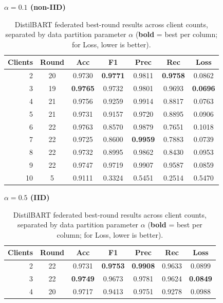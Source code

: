 \documentclass[conference]{IEEEtran}
\begin{document}
\begin{table}[t]
    \centering
    \caption{DistilBART federated best-round results across client counts, separated by data partition parameter $\alpha$ (\textbf{bold} = best per column; for Loss, lower is better).}
    \label{tab:fed_best_distilbart}
    {\small
    \begin{minipage}[t]{0.48\textwidth}
        \centering
        \textbf{$\alpha{=}0.1$ (non-IID)}\\[2pt]
        \begin{tabular}{rcccccc}
            \hline
            Clients & Round & Acc & F1 & Prec & Rec & Loss \\
            \hline
            2  & 20 & 0.9730 & \textbf{0.9771} & 0.9811 & \textbf{0.9758} & 0.0862 \\
            3  & 19 & \textbf{0.9765} & 0.9732 & 0.9801 & 0.9693 & \textbf{0.0696} \\
            4  & 21 & 0.9756 & 0.9259 & 0.9914 & 0.8817 & 0.0763 \\
            5  & 21 & 0.9731 & 0.9157 & 0.9720 & 0.8895 & 0.0906 \\
            6  & 22 & 0.9763 & 0.8570 & 0.9879 & 0.7651 & 0.1018 \\
            7  & 22 & 0.9725 & 0.8600 & \textbf{0.9959} & 0.7883 & 0.0739 \\
            8  & 22 & 0.9732 & 0.8995 & 0.9862 & 0.8430 & 0.0953 \\
            9  & 22 & 0.9747 & 0.9719 & 0.9907 & 0.9587 & 0.0859 \\
            10 & 5  & 0.9111 & 0.3324 & 0.5451 & 0.2514 & 0.5470 \\
            \hline
        \end{tabular}
    \end{minipage}\hfill
    \begin{minipage}[t]{0.48\textwidth}
        \centering
        \textbf{$\alpha{=}0.5$ (IID)}\\[2pt]
        \begin{tabular}{rcccccc}
            \hline
            Clients & Round & Acc & F1 & Prec & Rec & Loss \\
            \hline
            2  & 22 & 0.9731 & \textbf{0.9753} & \textbf{0.9908} & 0.9633 & 0.0899 \\
            3  & 22 & \textbf{0.9749} & 0.9673 & 0.9781 & 0.9624 & \textbf{0.0849} \\
            4  & 20 & 0.9717 & 0.9413 & 0.9751 & 0.9278 & 0.0988 \\

\end{tabular}
\end{minipage}}
\end{table}
\end{document}
